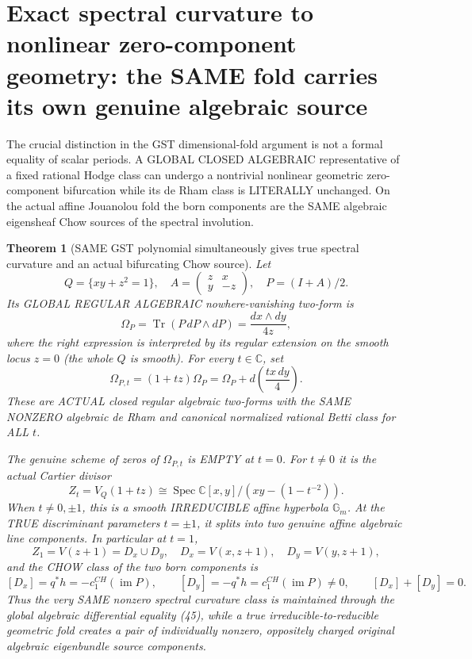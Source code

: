 \documentclass[11pt]{article}
\newtheorem{theorem}{Theorem}[section]
\begin{document}
\section{Exact spectral curvature to nonlinear zero-component geometry:
the SAME fold carries its own genuine algebraic source}
The crucial distinction in the GST dimensional-fold argument
is not a formal equality of scalar periods. A GLOBAL CLOSED
ALGEBRAIC representative of a fixed rational Hodge class
can undergo a nontrivial nonlinear geometric
zero-component bifurcation while its de Rham
class is LITERALLY unchanged.
On the actual affine Jouanolou fold the born
components are the SAME algebraic eigensheaf
Chow sources of the spectral involution.

\begin{theorem}[SAME GST polynomial simultaneously gives true spectral curvature and an actual bifurcating Chow source]
Let
\[
 Q=\{xy+z^2=1\},\quad
 A=\begin{pmatrix}z&x\\y&-z\end{pmatrix},
 \quad P=(I+A)/2.
\]
Its GLOBAL REGULAR ALGEBRAIC nowhere-vanishing
two-form is
\[
 \boxed{
 \Omega_P=\operatorname{Tr}(P\,dP\wedge dP)
          =\frac{dx\wedge dy}{4z},}             \tag{44}
\]
where the right expression is interpreted by its
regular extension on the smooth locus $z=0$
(the whole $Q$ is smooth).
For every $t\in\mathbb C$, set
\[
 \boxed{
  \Omega_{P,t}=(1+tz)\Omega_P
       =\Omega_P+d\left(\frac{t x\,dy}{4}\right).
 }                                            \tag{45}
\]
These are ACTUAL closed regular algebraic two-forms
with the SAME NONZERO algebraic de Rham
and canonical normalized rational Betti class
for ALL $t$.

The genuine scheme of zeros of
$\Omega_{P,t}$ is EMPTY at $t=0$.
For $t\ne0$ it is the actual Cartier divisor
\[
 \boxed{
 Z_t=V_Q(1+tz)
 \cong \operatorname{Spec}
          \mathbb C[x,y]/(xy-(1-t^{-2})).
 }                                            \tag{46}
\]
When $t\ne0,\pm1$, this is a smooth
IRREDUCIBLE affine hyperbola $\mathbb G_m$.
At the TRUE discriminant parameters
$t=\pm1$, it splits into two genuine affine
algebraic line components.
In particular at $t=1$,
\[
 \boxed{
 Z_1=V(z+1)=D_x\cup D_y,\quad
 D_x=V(x,z+1),\quad D_y=V(y,z+1),}
\]
and the CHOW class of the two born
components is
\[
 \boxed{
 [D_x]=q^*h=-c_1^{CH}(\operatorname{im}P),
 \qquad
 [D_y]=-q^*h=c_1^{CH}(\operatorname{im}P)\ne0,
 \qquad [D_x]+[D_y]=0 .}                      \tag{47}
\]
Thus the very SAME nonzero spectral curvature
class is maintained through the global algebraic
differential equality (45), while a true
irreducible-to-reducible geometric fold
creates a pair of individually nonzero,
oppositely charged original algebraic
eigenbundle source components.
\end{theorem}
\end{document}
